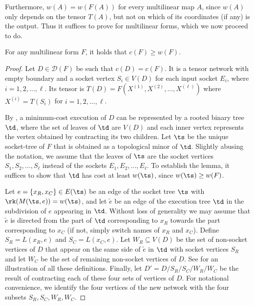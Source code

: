 Furthermore, $w(A) = w(F(A))$ for every multilinear map $A$, since
$w(A)$ only depends on the tensor $T(A)$, but not on which of its coordinates (if any) is the output.
Thus it suffices to prove  for
multilinear forms, which we now proceed to do.

\begin{lemma}
  For any multilinear form $F$, it holds that $c(F) \ge w(F)$.
\end{lemma}

\begin{proof}
  Let $D\in\mathscr{D}(F)$ be such that $c(D)=c(F)$. It is a tensor
  network with empty boundary and a socket vertex $S_i \in V(D)$ for
  each input socket $E_i$, where $i=1,2,\ldots,\ell$. Its tensor is
  $T(D) = F(X^{(1)}, X^{(2)},\ldots, X^{(\ell)})$ where $X^{(i)} =
  T(S_i)$ for $i=1,2,\ldots,\ell$.

  By , a minimum-cost execution of $D$
  can be represented by a rooted binary tree $\td$,
  where the set of leaves of $\td$ are $V(D)$ and each inner
  vertex represents the vertex obtained by contracting  its two children. Let $\ts$ be the unique socket-tree of $F$ that is obtained as a topological
  minor of $\td$. Slightly abusing the notation, we assume that the leaves of $\ts$ are the socket vertices  $S_1,S_2,\ldots,S_\ell$ instead of the sockets $E_1,E_2,\ldots,E_\ell$.
  To establish the lemma, it suffices to show that
  $\td$ has cost at least $w(\ts)$, since $w(\ts) \geq w(F)$.

  Let $e = \{x_R, x_C\} \in E(\ts)$ be an edge of the socket tree
  $\ts$ with $\rk(M(\ts, e)) = w(\ts)$, and let $\widetilde{e}$ be an edge of
  the execution tree $\td$ in the subdivision of $e$ appearing in
  $\td$. Without loss of generality we may assume that $\widetilde{e}$ is directed from the part of $\td$ corresponding to $x_R$ towards the part corresponding to $x_C$ (if not, simply switch names of $x_R$ and $x_C$).  Define  $S_R = L(x_R, e)$ and
  $S_C = L(x_C, e)$.  Let $W_R \subseteq V(D)$ be the set of
  non-socket vertices of $D$ that appear on the same side of $\widetilde{e}$ in $\td$ with socket vertices $S_R$ and let
  $W_C$ be the set of remaining non-socket vertices of $D$.  See  for an illustration of all these definitions.
  Finally, let $D' = D / S_R / S_C / W_R / W_C$ be the
  result of contracting each of these four sets of vertices of
  $D$.
  For notational convenience, we identify the four vertices of
  the new network with the four subsets $S_R, S_C, W_R, W_C$.


\end{proof}
